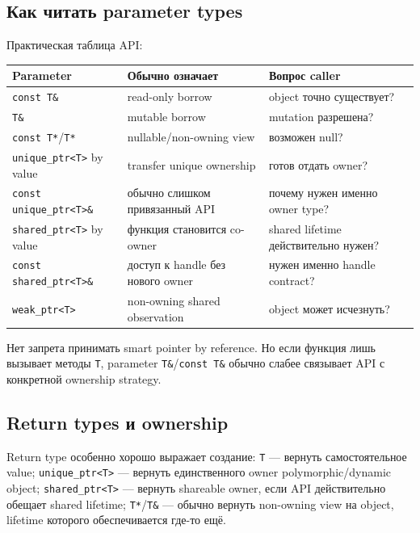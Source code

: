 \subsection{Как читать parameter types}

Практическая таблица API:

\begin{center}
\begin{tabularx}{\textwidth}{L{0.28\textwidth}YY}
\toprule
Parameter & Обычно означает & Вопрос caller \\
\midrule
\texttt{const T\&} & read-only borrow & object точно существует? \\
\texttt{T\&} & mutable borrow & mutation разрешена? \\
\texttt{const T*}/\texttt{T*} & nullable/non-owning view & возможен null? \\
\texttt{unique\_ptr<T>} by value & transfer unique ownership & готов отдать owner? \\
\texttt{const unique\_ptr<T>\&} & обычно слишком привязанный API & почему нужен именно owner type? \\
\texttt{shared\_ptr<T>} by value & функция становится co-owner & shared lifetime действительно нужен? \\
\texttt{const shared\_ptr<T>\&} & доступ к handle без нового owner & нужен именно handle contract? \\
\texttt{weak\_ptr<T>} & non-owning shared observation & object может исчезнуть? \\
\bottomrule
\end{tabularx}
\end{center}

Нет запрета принимать smart pointer by reference. Но если функция лишь вызывает
методы \texttt{T}, parameter \texttt{T\&}/\texttt{const T\&} обычно слабее
связывает API с конкретной ownership strategy.

\subsection{Return types и ownership}

Return type особенно хорошо выражает создание:
\texttt{T} --- вернуть самостоятельное value; \texttt{unique\_ptr<T>} --- вернуть единственного owner polymorphic/dynamic object; \texttt{shared\_ptr<T>} --- вернуть shareable owner, если API действительно обещает shared lifetime; \texttt{T*}/\texttt{T\&} --- обычно вернуть non-owning view на object, lifetime которого обеспечивается где-то ещё.

